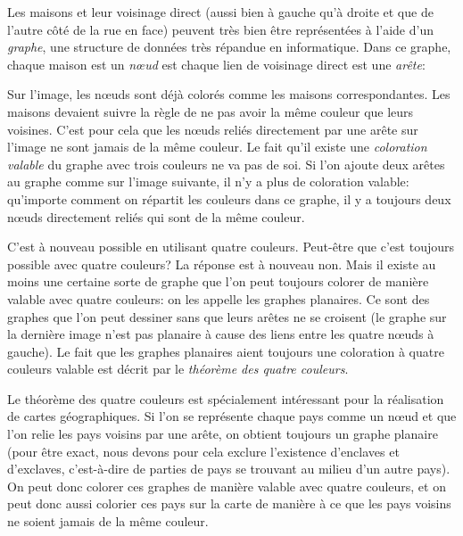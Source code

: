 \documentclass[a4paper,11pt]{report}
\newcommand{\taskGraphicsFolder}{..}
\begin{document}
Les maisons et leur voisinage direct (aussi bien à gauche qu’à droite et que de l’autre côté de la rue en face) peuvent très bien être représentées à l’aide d’un \emph{graphe}, une structure de données très répandue en informatique. Dans ce graphe, chaque maison est un \emph{nœud} est chaque lien de voisinage direct est une \emph{arête}:

{\centering%
\par}

Sur l’image, les nœuds sont déjà colorés comme les maisons correspondantes. Les maisons devaient suivre la règle de ne pas avoir la même couleur que leurs voisines. C’est pour cela que les nœuds reliés directement par une arête sur l’image ne sont jamais de la même couleur. Le fait qu’il existe une \emph{coloration valable} du graphe avec trois couleurs ne va pas de soi. Si l’on ajoute deux arêtes au graphe comme sur l’image suivante, il n’y a plus de coloration valable: qu’importe comment on répartit les couleurs dans ce graphe, il y a toujours deux nœuds directement reliés qui sont de la même couleur.

{\centering%
\par}

C’est à nouveau possible en utilisant quatre couleurs. Peut-être que c’est toujours possible avec quatre couleurs? La réponse est à nouveau non. Mais il existe au moins une certaine sorte de graphe que l’on peut toujours colorer de manière valable avec quatre couleurs: on les appelle les graphes planaires. Ce sont des graphes que l’on peut dessiner sans que leurs arêtes ne se croisent (le graphe sur la dernière image n’est pas planaire à cause des liens entre les quatre nœuds à gauche). Le fait que les graphes planaires aient toujours une coloration à quatre couleurs valable est décrit par le \emph{théorème des quatre couleurs}.

Le théorème des quatre couleurs est spécialement intéressant pour la réalisation de cartes géographiques. Si l’on se représente chaque pays comme un nœud et que l’on relie les pays voisins par une arête, on obtient toujours un graphe planaire (pour être exact, nous devons pour cela exclure l’existence d’enclaves et d’exclaves, c’est-à-dire de parties de pays se trouvant au milieu d’un autre pays). On peut donc colorer ces graphes de manière valable avec quatre couleurs, et on peut donc aussi colorier ces pays sur la carte de manière à ce que les pays voisins ne soient jamais de la même couleur.
\end{document}
